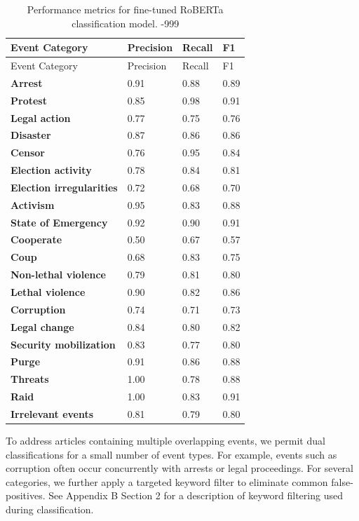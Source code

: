 \documentclass[
  letterpaper,
  DIV=11,
  numbers=noendperiod]{scrartcl}
\begin{document}
\hypertarget{tbl-roberta}{}
\begin{longtable}[]{@{}llll@{}}
\caption{\label{tbl-roberta}Performance metrics for fine-tuned RoBERTa
classification model. -999}\tabularnewline
\toprule\noalign{}
Event Category & Precision & Recall & F1 \\
\midrule\noalign{}
\endfirsthead
\toprule\noalign{}
Event Category & Precision & Recall & F1 \\
\midrule\noalign{}
\endhead
\bottomrule\noalign{}
\endlastfoot
\textbf{Arrest} & 0.91 & 0.88 & 0.89 \\
\textbf{Protest} & 0.85 & 0.98 & 0.91 \\
\textbf{Legal action} & 0.77 & 0.75 & 0.76 \\
\textbf{Disaster} & 0.87 & 0.86 & 0.86 \\
\textbf{Censor} & 0.76 & 0.95 & 0.84 \\
\textbf{Election activity} & 0.78 & 0.84 & 0.81 \\
\textbf{Election irregularities} & 0.72 & 0.68 & 0.70 \\
\textbf{Activism} & 0.95 & 0.83 & 0.88 \\
\textbf{State of Emergency} & 0.92 & 0.90 & 0.91 \\
\textbf{Cooperate} & 0.50 & 0.67 & 0.57 \\
\textbf{Coup} & 0.68 & 0.83 & 0.75 \\
\textbf{Non-lethal violence} & 0.79 & 0.81 & 0.80 \\
\textbf{Lethal violence} & 0.90 & 0.82 & 0.86 \\
\textbf{Corruption} & 0.74 & 0.71 & 0.73 \\
\textbf{Legal change} & 0.84 & 0.80 & 0.82 \\
\textbf{Security mobilization} & 0.83 & 0.77 & 0.80 \\
\textbf{Purge} & 0.91 & 0.86 & 0.88 \\
\textbf{Threats} & 1.00 & 0.78 & 0.88 \\
\textbf{Raid} & 1.00 & 0.83 & 0.91 \\
\textbf{Irrelevant events} & 0.81 & 0.79 & 0.80 \\
\end{longtable}

To address articles containing multiple overlapping events, we permit
dual classifications for a small number of event types. For example,
events such as corruption often occur concurrently with arrests or legal
proceedings. For several categories, we further apply a targeted keyword
filter to eliminate common false-positives. See Appendix B Section 2 for
a description of keyword filtering used during classification.
\end{document}
